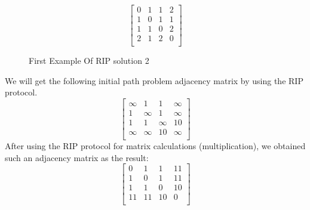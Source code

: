 \documentclass[a4paper,10pt]{article}
\begin{document}
\[
\begin{bmatrix}
    0 & 1 & 1 & 2 \\
    1 & 0 & 1 & 1 \\
    1 & 1 & 0 & 2 \\
    2 & 1 & 2 & 0 \\
\end{bmatrix}
\]
\begin{figure}[H]
\centering
{}
\label{example:rip:2}
\caption{First Example Of RIP solution 2}
\end{figure}
We will get the following initial path problem adjacency matrix by using the RIP protocol.
\[
\begin{bmatrix}
    \infty & 1 & 1 & \infty \\
    1 & \infty & 1 & \infty \\
    1 & 1 & \infty & 10 \\
    \infty & \infty & 10 & \infty \\
\end{bmatrix}
\]
After using the RIP protocol for matrix calculations (multiplication), we obtained such an adjacency matrix as the result:
\[
\begin{bmatrix}
    0 & 1 & 1 & 11 \\
    1 & 0 & 1 & 11 \\
    1 & 1 & 0 & 10 \\
    11 & 11 & 10 & 0 \\
\end{bmatrix}
\]
\end{document}
